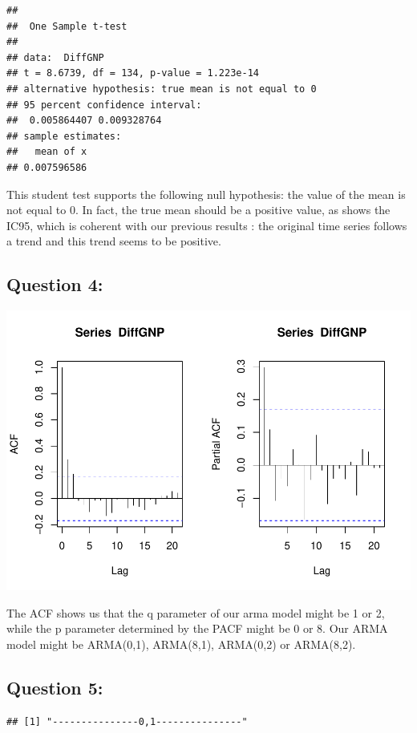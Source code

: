 \documentclass[]{article}
\begin{document}
\begin{verbatim}
## 
##  One Sample t-test
## 
## data:  DiffGNP
## t = 8.6739, df = 134, p-value = 1.223e-14
## alternative hypothesis: true mean is not equal to 0
## 95 percent confidence interval:
##  0.005864407 0.009328764
## sample estimates:
##   mean of x 
## 0.007596586
\end{verbatim}

This student test supports the following null hypothesis: the value of
the mean is not equal to 0. In fact, the true mean should be a positive
value, as shows the IC95, which is coherent with our previous results :
the original time series follows a trend and this trend seems to be
positive.

\subsection{Question 4:}\label{question-4-1}

\includegraphics{TP6_Analysis_Dejous_files/figure-latex/unnamed-chunk-6-1.pdf}

The ACF shows us that the q parameter of our arma model might be 1 or 2,
while the p parameter determined by the PACF might be 0 or 8. Our ARMA
model might be ARMA(0,1), ARMA(8,1), ARMA(0,2) or ARMA(8,2).

\subsection{Question 5:}\label{question-5-1}

\begin{verbatim}
## [1] "---------------0,1---------------"
\end{verbatim}
\end{document}
